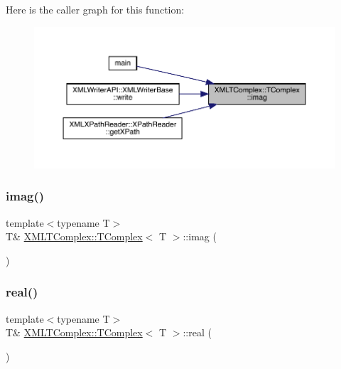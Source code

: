 Here is the caller graph for this function\+:\nopagebreak
\begin{figure}[H]
\begin{center}
\leavevmode
\includegraphics[width=350pt]{db/dbe/classXMLTComplex_1_1TComplex_af991451a5500d81f96df2a39d70d7196_icgraph}
\end{center}
\end{figure}
\mbox{\label{classXMLTComplex_1_1TComplex_af991451a5500d81f96df2a39d70d7196}} 
\subsubsection{\texorpdfstring{imag()}{imag()}\hspace{0.1cm}{\footnotesize\ttfamily [2/2]}}
{\footnotesize\ttfamily template$<$typename T$>$ \\
T\& \mbox{\hyperlink{classXMLTComplex_1_1TComplex}{X\+M\+L\+T\+Complex\+::\+T\+Complex}}$<$ T $>$\+::imag (\begin{DoxyParamCaption}{ }\end{DoxyParamCaption})\hspace{0.3cm}{\ttfamily [inline]}}

\mbox{\label{classXMLTComplex_1_1TComplex_a3f7e9b8dd1c6a18da9a944d51d8118c9}} 
\subsubsection{\texorpdfstring{real()}{real()}\hspace{0.1cm}{\footnotesize\ttfamily [1/2]}}
{\footnotesize\ttfamily template$<$typename T$>$ \\
T\& \mbox{\hyperlink{classXMLTComplex_1_1TComplex}{X\+M\+L\+T\+Complex\+::\+T\+Complex}}$<$ T $>$\+::real (\begin{DoxyParamCaption}{ }\end{DoxyParamCaption})\hspace{0.3cm}{\ttfamily [inline]}}

